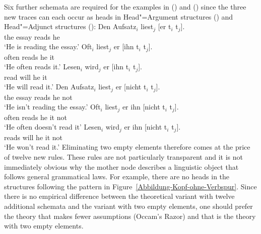 Six further schemata are required for the examples in () and () since the three new traces can each occur
as heads in Head"=Argument structures () and Head"=Adjunct structures ():
\eal
\ex 
\gll Den Aufsatz$_i$ liest$_j$ [er t$_i$ t$_j$].\\
	 the essay reads \spacebr{}he\\
\glt `He is reading the essay.'
\ex 
\gll Oft$_i$ liest$_j$ er [ihn t$_i$ t$_j$].\\
	 often reads he \spacebr{}it\\
\glt `He often reads it.'
\ex 
\gll Lesen$_i$ wird$_j$ er [ihn t$_i$ t$_j$].\\
	 read will he \spacebr{}it\\
\glt `He will read it.'
\zl
\eal
\ex 
\gll Den Aufsatz$_i$ liest$_j$ er [nicht t$_i$ t$_j$].\\
	 the essay reads he \spacebr{}not\\
\glt `He isn't reading the essay.'
\ex 
\gll Oft$_i$ liest$_j$ er ihn [nicht t$_i$ t$_j$].\\
	 often reads he it \spacebr{}not\\
\glt `He often doesn't read it'
\ex 
\gll Lesen$_i$ wird$_j$ er ihn [nicht t$_i$ t$_j$].\\
	 reads will he it \spacebr{}not\\
\glt `He won't read it.'
\zl
Eliminating two empty elements therefore comes at the price of twelve new rules. These rules are not particularly transparent and it is not immediately
obvious why the mother node describes a linguistic object that follows general grammatical laws. For example, there are no heads in the structures following
the pattern in Figure~\ref{Abbildung-Kopf-ohne-Verbspur}. Since there is no empirical difference between the theoretical variant with twelve
additional schemata and the variant with two empty elements, one should prefer the theory that makes fewer assumptions (Occam's Razor) and that
is the theory with two empty elements.

